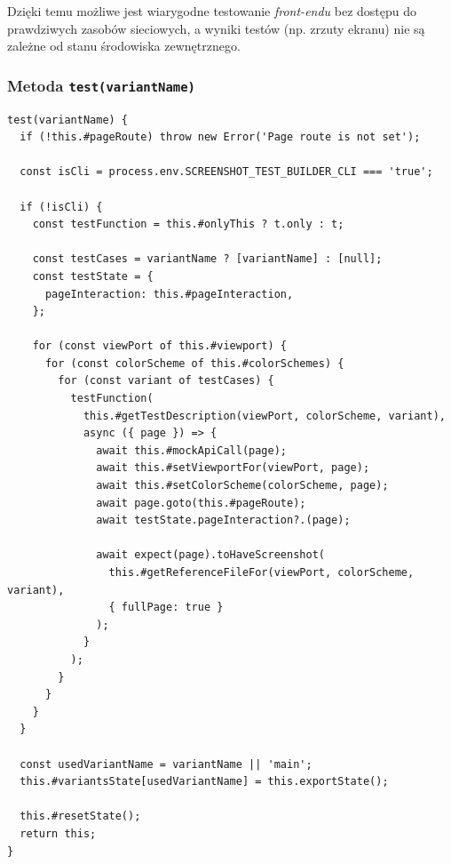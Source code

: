 \documentclass[12pt]{report}
\begin{document}
Dzięki temu możliwe jest wiarygodne testowanie \textit{front-endu} bez dostępu do prawdziwych zasobów sieciowych, a wyniki testów (np. zrzuty ekranu) nie są zależne od stanu środowiska zewnętrznego.

\subsubsection{Metoda \texttt{test(variantName)}}
\label{sec:test_variantName}

\begin{verbatim}
test(variantName) {
  if (!this.#pageRoute) throw new Error('Page route is not set');

  const isCli = process.env.SCREENSHOT_TEST_BUILDER_CLI === 'true';

  if (!isCli) {
    const testFunction = this.#onlyThis ? t.only : t;

    const testCases = variantName ? [variantName] : [null];
    const testState = {
      pageInteraction: this.#pageInteraction,
    };

    for (const viewPort of this.#viewport) {
      for (const colorScheme of this.#colorSchemes) {
        for (const variant of testCases) {
          testFunction(
            this.#getTestDescription(viewPort, colorScheme, variant),
            async ({ page }) => {
              await this.#mockApiCall(page);
              await this.#setViewportFor(viewPort, page);
              await this.#setColorScheme(colorScheme, page);
              await page.goto(this.#pageRoute);
              await testState.pageInteraction?.(page);

              await expect(page).toHaveScreenshot(
                this.#getReferenceFileFor(viewPort, colorScheme, variant),
                { fullPage: true }
              );
            }
          );
        }
      }
    }
  }

  const usedVariantName = variantName || 'main';
  this.#variantsState[usedVariantName] = this.exportState();

  this.#resetState();
  return this;
}
\end{verbatim}
\end{document}
